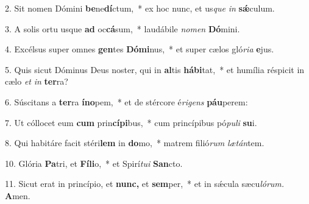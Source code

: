 \item 2. Sit nomen Dómini \textbf{be}ne\textbf{dí}ctum,~* ex hoc nunc, et us\hspace{0.03em}\textit{que} \textit{in} \textbf{sǽ}culum.
\item 3. A solis ortu usque \textbf{ad} oc\textbf{cá}sum,~* laudábile \textit{nomen} \textbf{Dó}mini.
\item 4. Excélsus super omnes \textbf{gen}tes \textbf{Dómi}nus,~* et super cælos gló\textit{ria} \textbf{e}jus.
\item 5. Quis sicut Dóminus Deus noster, qui in \textbf{al}tis \textbf{hábi}tat,~* et humília réspicit in cælo \textit{et} \textit{in} \textbf{ter}ra?
\item 6. Súscitans a \textbf{ter}ra \textbf{íno}pem,~* et de stércore é\hspace{0.03em}\textit{rigens} \textbf{páu}perem:
\item 7. Ut cóllocet eum \textbf{cum} prin\textbf{cípi}bus,~* cum princípibus pó\textit{puli} \textbf{su}i.
\item 8. Qui habitáre facit stéri\textbf{lem} in \textbf{do}mo,~* matrem filió\textit{rum} \textit{lætán}tem.
\item 10. Glória \textbf{Pa}tri, et \textbf{Fíli}o,~* et Spirí\hspace{0.03em}\textit{tui} \textbf{San}cto.
\item 11. Sicut erat in princípio, et \textbf{nunc,} et \textbf{sem}per,~* et in sǽcula sæcu\hspace{0.03em}\textit{lórum.} \textbf{A}men.
